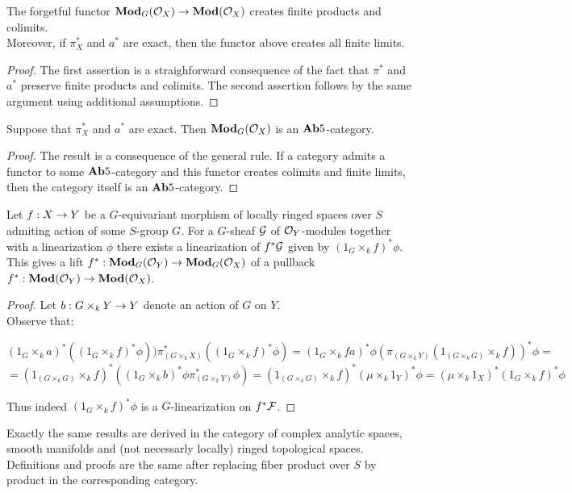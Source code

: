 \begin{proposition}
The forgetful functor $\mathbf{Mod}_G({\mathcal O}_X)\rightarrow \mathbf{Mod}({\mathcal O}_X)$ creates finite products and colimits.\\
Moreover, if $\pi^*_X$ and $a^*$ are exact, then the functor above creates all finite limits.
\end{proposition}
\begin{proof}
The first assertion is a straighforward consequence of the fact that $\pi^*$ and $a^*$ preserve finite products and colimits. The second assertion follows by the same argument using additional assumptions. 
\end{proof}

\begin{corollary}
Suppose that $\pi^*_X$ and $a^*$ are exact. Then $\mathbf{Mod}_G({\mathcal O}_X)$ is an $\mathbf{Ab}5$-category.
\end{corollary}
\begin{proof}
The result is a consequence of the general rule. If a category admits a functor to some $\mathbf{Ab}5$-category and this functor creates colimits and finite limits, then the  category itself is an $\mathbf{Ab}5$-category.
\end{proof}

\begin{proposition}
Let $f:X\rightarrow Y$ be a $G$-equivariant morphism of locally ringed spaces over $S$ admiting action of some $S$-group $G$. For a $G$-sheaf ${\mathcal G}$ of ${\mathcal O}_Y$-modules together with a linearization $\phi$ there exists a linearization of $f^*{\mathcal G}$ given by $(1_G\times_k f)^*\phi$. This gives a lift $f^*:\mathbf{Mod}_G({\mathcal O}_Y)\rightarrow \mathbf{Mod}_G({\mathcal O}_X)$ of a pullback $f^*:\mathbf{Mod}({\mathcal O}_Y)\rightarrow \mathbf{Mod}({\mathcal O}_X)$.
\end{proposition}
\begin{proof}
Let $b:G\times_kY\rightarrow Y$ denote an action of $G$ on $Y$.\\
Observe that:
\begin{center}
$(1_G\times_ka)^*((1_G\times_kf)^*\phi))\pi_{(G\times_kX)}^*((1_G\times_kf)^*\phi)=(1_G\times_kfa)^*\phi (\pi_{(G\times_kY)}(1_{(G\times_kG)}\times_kf))^*\phi=$\\$=(1_{(G\times_kG)}\times_kf)^*((1_G\times_kb)^*\phi \pi_{(G\times_kY)}^*\phi)=(1_{(G\times_kG)}\times_kf)^*(\mu\times_k1_Y)^*\phi=(\mu\times_k1_X)^*(1_G\times_kf)^*\phi$
\end{center}
Thus indeed $(1_G\times_kf)^*\phi$ is a $G$-linearization on $f^*{\mathcal F}$. 
\end{proof}

\begin{remark}
Exactly the same results are derived in the category of complex analytic spaces, smooth manifolds and (not necessarly locally) ringed topological spaces. Definitions and proofs are the same after replacing fiber product over $S$ by product in the corresponding category.
\end{remark}


